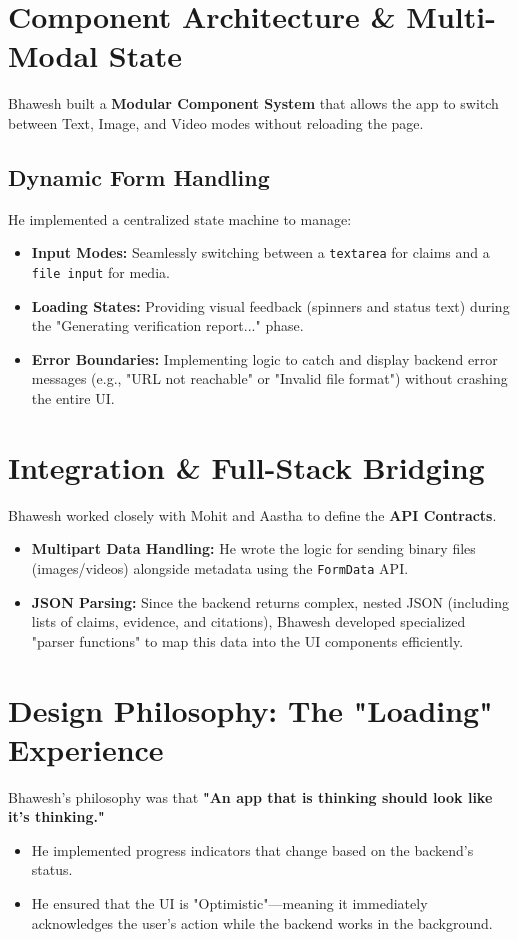 \documentclass[12pt]{article}
\begin{document}
\section{Component Architecture & Multi-Modal State}
Bhawesh built a \textbf{Modular Component System} that allows the app to switch between Text, Image, and Video modes without reloading the page.

\subsection{Dynamic Form Handling}
He implemented a centralized state machine to manage:
\begin{itemize}
    \item \textbf{Input Modes:} Seamlessly switching between a \texttt{textarea} for claims and a \texttt{file input} for media.
    \item \textbf{Loading States:} Providing visual feedback (spinners and status text) during the "Generating verification report..." phase.
    \item \textbf{Error Boundaries:} Implementing logic to catch and display backend error messages (e.g., "URL not reachable" or "Invalid file format") without crashing the entire UI.
\end{itemize}

\section{Integration & Full-Stack Bridging}
Bhawesh worked closely with Mohit and Aastha to define the \textbf{API Contracts}. 
\begin{itemize}
    \item \textbf{Multipart Data Handling:} He wrote the logic for sending binary files (images/videos) alongside metadata using the \texttt{FormData} API.
    \item \textbf{JSON Parsing:} Since the backend returns complex, nested JSON (including lists of claims, evidence, and citations), Bhawesh developed specialized "parser functions" to map this data into the UI components efficiently.
\end{itemize}

\section{Design Philosophy: The "Loading" Experience}
Bhawesh's philosophy was that \textbf{"An app that is thinking should look like it's thinking."} 
\begin{itemize}
    \item He implemented progress indicators that change based on the backend's status.
    \item He ensured that the UI is "Optimistic"—meaning it immediately acknowledges the user's action while the backend works in the background.
\end{itemize}
\end{document}
